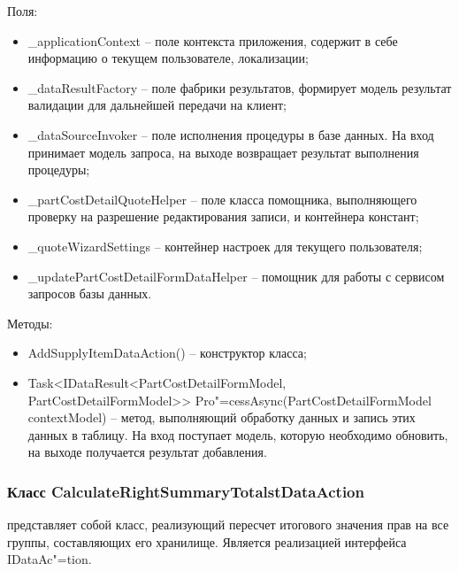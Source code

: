 Поля:
\begin{itemize}
  \item \_applicationContext – поле контекста приложения, содержит в себе информацию о текущем пользователе, локализации;
  \item \_dataResultFactory – поле фабрики результатов, формирует модель результат валидации для дальнейшей передачи на клиент;
  \item \_dataSourceInvoker – поле исполнения процедуры в базе данных. На вход принимает модель запроса, на выходе возвращает результат выполнения процедуры;
  \item \_partCostDetailQuoteHelper – поле класса помощника, выполняющего проверку на разрешение редактирования записи, и контейнера констант;
  \item \_quoteWizardSettings – контейнер настроек для текущего пользователя;
  \item \_updatePartCostDetailFormDataHelper – помощник для работы с сервисом запросов базы данных.
\end{itemize}

Методы:
\begin{itemize}
  \item AddSupplyItemDataAction() – конструктор класса;
  \item Task<IDataResult<PartCostDetailFormModel, PartCostDetailFormModel>> Pro"=cessAsync(PartCostDetailFormModel contextModel) – метод, выполняющий обработку данных и запись этих данных в таблицу. На вход поступает модель, которую необходимо обновить, на выходе получается результат добавления.
\end{itemize}

\subsubsection{Класс CalculateRightSummaryTotalstDataAction }
\label{sub:arch_and_mod:data_layer:calculate_right_summary_totalst}

представляет собой класс, реализующий пересчет итогового значения прав на все группы, составляющих его хранилище. Является реализацией интерфейса IDataAc"=tion.

